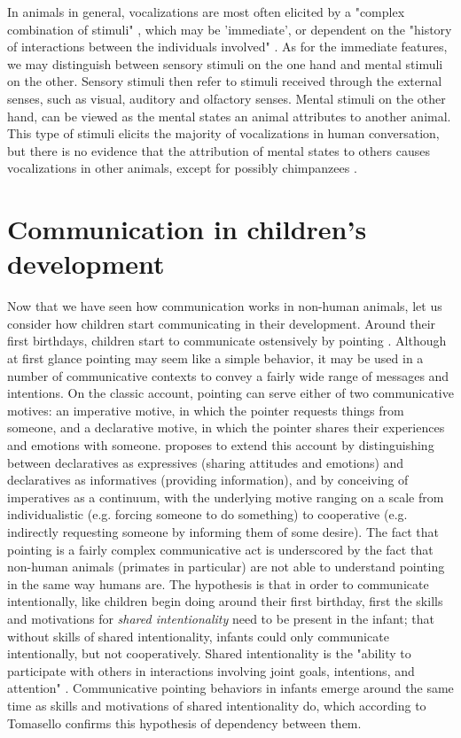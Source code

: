 In animals in general, vocalizations are most often elicited by a "complex combination of stimuli" \citep[p.~150]{SeyfarthCheney03}, which may be 'immediate', or dependent on the "history of interactions between the individuals involved" \citep[p.~151]{SeyfarthCheney03}. As for the immediate features, we may distinguish between sensory stimuli on the one hand and mental stimuli on the other. Sensory stimuli then refer to stimuli received through the external senses, such as visual, auditory and olfactory senses. Mental stimuli on the other hand, can be viewed as the mental states an animal attributes to another animal. This type of stimuli elicits the majority of vocalizations in human conversation, but there is no evidence that the attribution of mental states to others causes vocalizations in other animals, except for possibly chimpanzees \citep{SeyfarthCheney03}.

\section{Communication in children's development}
\label{sec:comm:ontogeny}

Now that we have seen how communication works in non-human animals, let us consider how children start communicating in their development.
Around their first birthdays, children start to communicate ostensively by pointing \citep{Tomasello08-origins}. Although at first glance pointing may seem like a simple behavior, it may be used in a number of communicative contexts to convey a fairly wide range of messages and intentions. 
On the classic account, pointing can serve either of two communicative motives: an imperative motive, in which the pointer requests things from someone, and a declarative motive, in which the pointer shares their experiences and emotions with someone. 
\citet{Tomasello08-origins} proposes to extend this account by distinguishing between declaratives as expressives (sharing attitudes and emotions) and declaratives as informatives (providing information), and by conceiving of imperatives as a continuum, with the underlying motive ranging on a scale from individualistic (e.g. forcing someone to do something) to cooperative (e.g. indirectly requesting someone by informing them of some desire). 
The fact that pointing is a fairly complex communicative act is underscored by the fact that non-human animals (primates in particular) are not able to understand pointing in the same way humans are. 
The hypothesis is that in order to communicate intentionally, like children begin doing around their first birthday, first the skills and motivations for \emph{shared intentionality} need to be present in the infant; that without skills of shared intentionality, infants could only communicate intentionally, but not cooperatively.
Shared intentionality is the "ability to participate with others in interactions involving joint goals, intentions, and attention" \citep[p.~139]{Tomasello08-origins}. Communicative pointing behaviors in infants emerge around the same time as skills and motivations of shared intentionality do, which according to Tomasello confirms this hypothesis of dependency between them.


